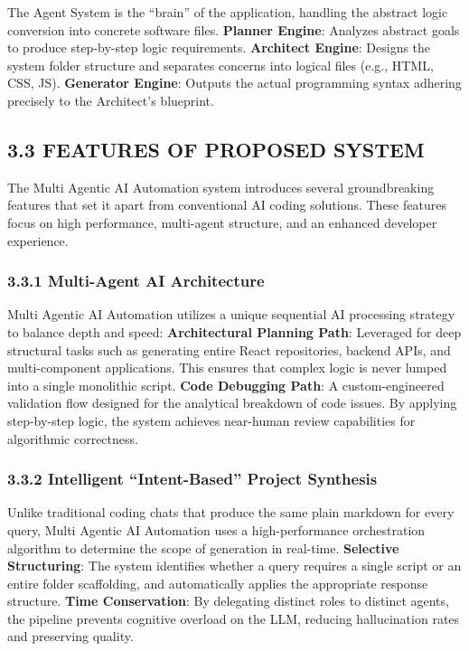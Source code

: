 \documentclass[
  12pt,
]{article}
\begin{document}
The Agent System is the ``brain'' of the application, handling the
abstract logic conversion into concrete software files. \textbf{Planner
Engine}: Analyzes abstract goals to produce step-by-step logic
requirements. \textbf{Architect Engine}: Designs the system folder
structure and separates concerns into logical files (e.g., HTML, CSS,
JS). \textbf{Generator Engine}: Outputs the actual programming syntax
adhering precisely to the Architect's blueprint.

\subsection{3.3 FEATURES OF PROPOSED
SYSTEM}\label{features-of-proposed-system}

The Multi Agentic AI Automation system introduces several groundbreaking
features that set it apart from conventional AI coding solutions. These
features focus on high performance, multi-agent structure, and an
enhanced developer experience.

\subsubsection{3.3.1 Multi-Agent AI
Architecture}\label{multi-agent-ai-architecture}

Multi Agentic AI Automation utilizes a unique sequential AI processing
strategy to balance depth and speed: \textbf{Architectural Planning
Path}: Leveraged for deep structural tasks such as generating entire
React repositories, backend APIs, and multi-component applications. This
ensures that complex logic is never lumped into a single monolithic
script. \textbf{Code Debugging Path}: A custom-engineered validation
flow designed for the analytical breakdown of code issues. By applying
step-by-step logic, the system achieves near-human review capabilities
for algorithmic correctness.

\subsubsection{3.3.2 Intelligent ``Intent-Based'' Project
Synthesis}\label{intelligent-intent-based-project-synthesis}

Unlike traditional coding chats that produce the same plain markdown for
every query, Multi Agentic AI Automation uses a high-performance
orchestration algorithm to determine the scope of generation in
real-time. \textbf{Selective Structuring}: The system identifies whether
a query requires a single script or an entire folder scaffolding, and
automatically applies the appropriate response structure. \textbf{Time
Conservation}: By delegating distinct roles to distinct agents, the
pipeline prevents cognitive overload on the LLM, reducing hallucination
rates and preserving quality.
\end{document}
